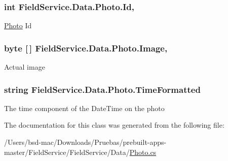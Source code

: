 \hypertarget{class_field_service_1_1_data_1_1_photo_a42745ec1f6ca35ea720f9c83f8823cda}{
\subsubsection[{Id}]{\setlength{\rightskip}{0pt plus 5cm}int Field\+Service.\+Data.\+Photo.\+Id\hspace{0.3cm}{\ttfamily [get]}, {\ttfamily [set]}}}\label{class_field_service_1_1_data_1_1_photo_a42745ec1f6ca35ea720f9c83f8823cda}


\hyperlink{class_field_service_1_1_data_1_1_photo}{Photo} Id 

\hypertarget{class_field_service_1_1_data_1_1_photo_a9569a230af280d0f6a1981b3ae052725}{
\subsubsection[{Image}]{\setlength{\rightskip}{0pt plus 5cm}byte \mbox{[}$\,$\mbox{]} Field\+Service.\+Data.\+Photo.\+Image\hspace{0.3cm}{\ttfamily [get]}, {\ttfamily [set]}}}\label{class_field_service_1_1_data_1_1_photo_a9569a230af280d0f6a1981b3ae052725}


Actual image 

\hypertarget{class_field_service_1_1_data_1_1_photo_a338e84fca5f86bb0fdbb3962028cd960}{
\subsubsection[{Time\+Formatted}]{\setlength{\rightskip}{0pt plus 5cm}string Field\+Service.\+Data.\+Photo.\+Time\+Formatted\hspace{0.3cm}{\ttfamily [get]}}}\label{class_field_service_1_1_data_1_1_photo_a338e84fca5f86bb0fdbb3962028cd960}


The time component of the Date\+Time on the photo 



The documentation for this class was generated from the following file\+:\begin{DoxyCompactItemize}
\item 
/\+Users/bsd-\/mac/\+Downloads/\+Pruebas/prebuilt-\/apps-\/master/\+Field\+Service/\+Field\+Service/\+Data/\hyperlink{_photo_8cs}{Photo.\+cs}\end{DoxyCompactItemize}

